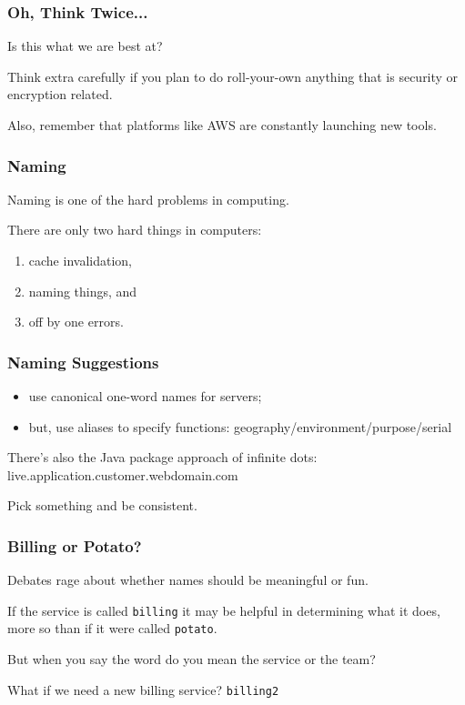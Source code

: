 \begin{frame}
\frametitle{Oh, Think Twice...}

Is this what we are best at?

Think extra carefully if you plan to do roll-your-own anything that is security or encryption related.

Also, remember that platforms like AWS are constantly launching new tools.

\end{frame}

\begin{frame}
\frametitle{Naming}

\Large

Naming is one of the hard problems in computing. 

There are only two hard things in computers:
\begin{enumerate}
\item cache invalidation,
\item naming things, and
\item off by one errors.
\end{enumerate}

\end{frame}



\begin{frame}
\frametitle{Naming Suggestions}

\large

\begin{itemize}
\item use canonical one-word names for servers;
\item but, use aliases to specify functions: geography/environment/purpose/serial
\end{itemize}


There's also the Java package approach of infinite dots: live.application.customer.webdomain.com

Pick something and be consistent.

\end{frame}


\begin{frame}
\frametitle{Billing or Potato?}

Debates rage about whether names should be meaningful or fun.

If the service is called \texttt{billing} it may be helpful in determining what it does, more so than if it were called \texttt{potato}.

But when you say the word do you mean the service or the team?

What if we need a new billing service? \texttt{billing2}

\end{frame}

